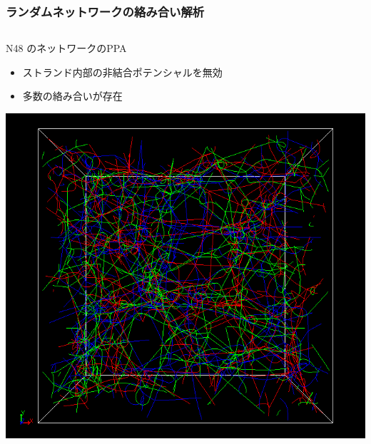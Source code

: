 \documentclass[12pt, dvipdfmx]{beamer}
\begin{document}
\begin{frame}
	\frametitle{ランダムネットワークの絡み合い解析}
		\vspace{-6mm}
		\begin{columns}[T, onlytextwidth]
			\begin{block}{N48 のネットワークのPPA}
				\begin{itemize}
					\item ストランド内部の非結合ポテンシャルを無効
					\item \alert{多数の絡み合いが存在}
				\end{itemize}
				\begin{center}
					\includegraphics[width=.65\textwidth]{N48_f4_PPA.png}
				\end{center}
				

\end{block}
\end{columns}
\end{frame}
\end{document}
